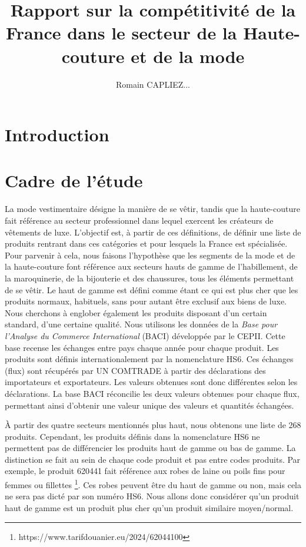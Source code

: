 \documentclass[french,10pt,a4paper]{article}
\title{Rapport sur la compétitivité de la France dans le secteur de la Haute-couture et de la mode}
\author{Romain CAPLIEZ...}
\begin{document}
\maketitle

\section{Introduction}

\newpage

\section{Cadre de l'étude}

La mode vestimentaire désigne la manière de se vêtir, tandis que la haute-couture fait référence au secteur professionnel dans lequel exercent les créateurs de vêtements de luxe. L'objectif est, à partir de ces définitions, de définir une liste de produits rentrant dans ces catégories et pour lesquels la France est spécialisée. Pour parvenir à cela, nous faisons l'hypothèse que les segments de la mode et de la haute-couture font référence aux secteurs hauts de gamme de l'habillement, de la maroquinerie, de la bijouterie et des chaussures, tous les éléments permettant de se vêtir. Le haut de gamme est défini comme étant ce qui est plus cher que les produits normaux, habituels, sans pour autant être exclusif aux biens de luxe. Nous cherchons à englober également les produits disposant d'un certain standard, d'une certaine qualité. Nous utilisons les données de la \textit{Base pour l'Analyse du Commerce International} (BACI) \cite{Gaulier2010} développée par le CEPII. Cette base recense les échanges entre pays chaque année pour chaque produit. Les produits sont définis internationalement par la nomenclature HS6. Ces échanges (flux) sont récupérés par UN COMTRADE à partir des déclarations des importateurs et exportateurs. Les valeurs obtenues sont donc différentes selon les déclarations. La base BACI réconcilie les deux valeurs obtenues pour chaque flux, permettant ainsi d'obtenir une valeur unique des valeurs et quantités échangées.

À partir des quatre secteurs mentionnés plus haut, nous obtenons une liste de 268 produits. Cependant, les produits définis dans la nomenclature HS6 ne permettent pas de différencier les produits haut de gamme ou bas de gamme. La distinction se fait au sein de chaque code produit et pas entre codes produits. Par exemple, le produit 620441 fait référence aux \og robes de laine ou poils fins pour femmes ou fillettes \fg{} \footnote{https://www.tarifdouanier.eu/2024/62044100}. Ces robes peuvent être du haut de gamme ou non, mais cela ne sera pas dicté par son numéro HS6. Nous allons donc considérer qu'un produit haut de gamme est un produit plus cher qu'un produit similaire moyen/normal.
\end{document}
